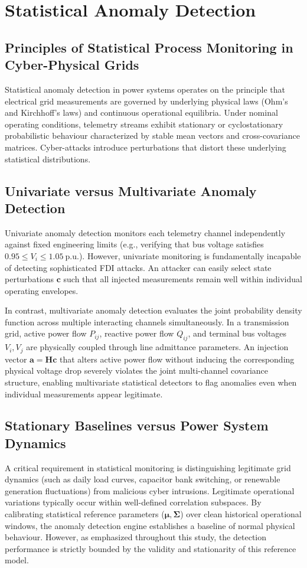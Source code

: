 \documentclass[12pt,a4paper]{report}
\begin{document}
\section{Statistical Anomaly Detection}

\subsection{Principles of Statistical Process Monitoring in Cyber-Physical Grids}
Statistical anomaly detection in power systems operates on the principle that electrical
grid measurements are governed by underlying physical laws (Ohm's and Kirchhoff's laws)
and continuous operational equilibria. Under nominal operating conditions, telemetry
streams exhibit stationary or cyclostationary probabilistic behaviour characterized by
stable mean vectors and cross-covariance matrices. Cyber-attacks introduce perturbations
that distort these underlying statistical distributions.

\subsection{Univariate versus Multivariate Anomaly Detection}
Univariate anomaly detection monitors each telemetry channel independently against fixed
engineering limits (e.g., verifying that bus voltage satisfies $0.95 \le V_i \le 1.05~\text{p.u.}$).
However, univariate monitoring is fundamentally incapable of detecting sophisticated FDI
attacks. An attacker can easily select state perturbations $\boldsymbol{c}$ such that all
injected measurements remain well within individual operating envelopes.

In contrast, multivariate anomaly detection evaluates the joint probability density function
across multiple interacting channels simultaneously. In a transmission grid, active power flow
$P_{ij}$, reactive power flow $Q_{ij}$, and terminal bus voltages $V_i, V_j$ are physically
coupled through line admittance parameters. An injection vector $\boldsymbol{a} = \boldsymbol{H}\boldsymbol{c}$
that alters active power flow without inducing the corresponding physical voltage drop
severely violates the joint multi-channel covariance structure, enabling multivariate
statistical detectors to flag anomalies even when individual measurements appear legitimate.

\subsection{Stationary Baselines versus Power System Dynamics}
A critical requirement in statistical monitoring is distinguishing legitimate grid dynamics
(such as daily load curves, capacitor bank switching, or renewable generation fluctuations)
from malicious cyber intrusions. Legitimate operational variations typically occur within
well-defined correlation subspaces. By calibrating statistical reference parameters
($\boldsymbol{\mu}, \boldsymbol{\Sigma}$) over clean historical operational windows, the
anomaly detection engine establishes a baseline of normal physical behaviour. However, as
emphasized throughout this study, the detection performance is strictly bounded by the
validity and stationarity of this reference model.
\end{document}
